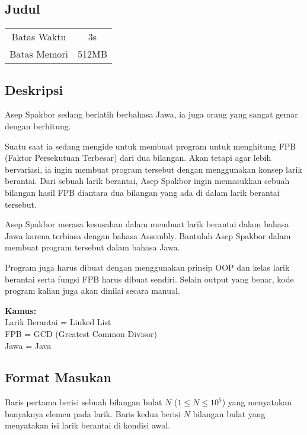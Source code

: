 \documentclass{article}
\begin{document}
\begin{center}

    
    \section*{Judul} %

    \begin{tabular}{ | c c | }
        \hline
        Batas Waktu  & 3s \\    %
        Batas Memori & 512MB \\  %
        \hline
    \end{tabular}
\end{center}

\subsection*{Deskripsi}

Asep Spakbor sedang berlatih berbahasa Jawa, ia juga orang yang sangat gemar dengan berhitung. 

Suatu saat ia sedang mengide untuk membuat program untuk menghitung FPB (Faktor Persekutuan Terbesar) dari dua bilangan. Akan tetapi agar lebih bervariasi, ia ingin membuat program tersebut dengan menggunakan konsep larik berantai. Dari sebuah larik berantai, Asep Spakbor ingin memasukkan sebuah bilangan hasil FPB diantara dua bilangan yang ada di dalam larik berantai tersebut.

Asep Spakbor merasa kesusahan dalam membuat larik berantai dalam bahasa Jawa karena terbiasa dengan bahasa Assembly. Bantulah Asep Spakbor dalam membuat program tersebut dalam bahasa Jawa.

Program juga harus dibuat dengan menggunakan prinsip OOP dan kelas larik berantai serta fungsi FPB harus dibuat sendiri. Selain output yang benar, kode program kalian juga akan dinilai secara manual.

\textbf{Kamus:} \\
Larik Berantai = Linked List \\
FPB = GCD (Greatest Common Divisor) \\
Jawa = Java \\

\subsection*{Format Masukan}

Baris pertama berisi sebuah bilangan bulat $N$ ($1 \leq N \leq 10^{5}$) yang menyatakan banyaknya elemen pada larik. Baris kedua berisi $N$ bilangan bulat yang menyatakan isi larik berantai di kondisi awal.
\end{document}
